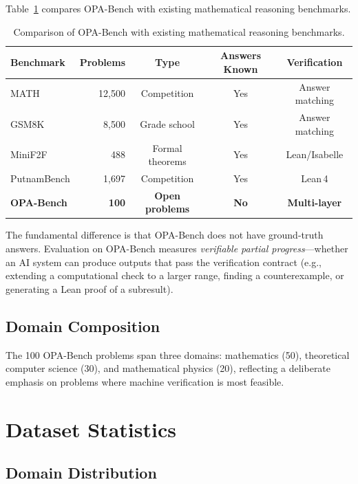 \documentclass[11pt]{article}
\begin{document}
Table~\ref{tab:comparison} compares OPA-Bench with existing mathematical reasoning benchmarks.

\begin{table}[H]
\centering
\caption{Comparison of OPA-Bench with existing mathematical reasoning benchmarks.}
\label{tab:comparison}
\small
\begin{tabular}{@{}lrccc@{}}
\toprule
\textbf{Benchmark} & \textbf{Problems} & \textbf{Type} & \textbf{Answers Known} & \textbf{Verification} \\
\midrule
MATH & 12{,}500 & Competition & Yes & Answer matching \\
GSM8K & 8{,}500 & Grade school & Yes & Answer matching \\
MiniF2F & 488 & Formal theorems & Yes & Lean/Isabelle \\
PutnamBench & 1{,}697 & Competition & Yes & Lean\,4 \\
\midrule
\textbf{OPA-Bench} & \textbf{100} & \textbf{Open problems} & \textbf{No} & \textbf{Multi-layer} \\
\bottomrule
\end{tabular}
\end{table}

The fundamental difference is that OPA-Bench does not have ground-truth answers.
Evaluation on OPA-Bench measures \emph{verifiable partial progress}---whether an AI system can produce outputs that pass the verification contract (e.g., extending a computational check to a larger range, finding a counterexample, or generating a Lean proof of a subresult).

\subsection{Domain Composition}

The 100 OPA-Bench problems span three domains: mathematics (50), theoretical computer science (30), and mathematical physics (20), reflecting a deliberate emphasis on problems where machine verification is most feasible.

\section{Dataset Statistics}
\label{sec:stats}

\subsection{Domain Distribution}
\end{document}
